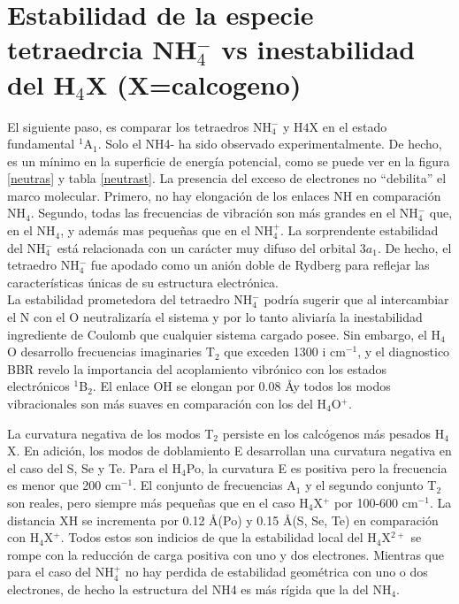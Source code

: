 \documentclass[12pt]{report}
\begin{document}
\section{Estabilidad de la especie tetraedrcia NH$_4^-$ vs inestabilidad del H$_4$X (X=calcogeno)}


El siguiente paso, es comparar los tetraedros NH$_4^-$ y H$4$X en el estado fundamental $^1$A$_1$. Solo el NH4- ha sido observado experimentalmente\cite{Beyer1977}. De hecho, es un mínimo en la superficie de energía potencial, como se puede ver en la figura \ref{neutras} y tabla \ref{neutrast}. La presencia del exceso de electrones no “debilita” el marco molecular. Primero, no hay elongación de los enlaces NH en comparación NH$_4$. Segundo, todas las frecuencias de vibración son más grandes en el NH$_4^-$ que, en el NH$_4$, y además mas pequeñas que en el NH$_4^+$. La sorprendente estabilidad del NH$_4^-$ está relacionada con un carácter muy difuso del orbital $3a_1$. De hecho, el tetraedro NH$_4^-$ fue apodado como un anión doble de Rydberg\cite{Beyer1977} para reflejar las características únicas de su estructura electrónica. 
\\


La estabilidad prometedora del tetraedro NH$_4^-$ podría sugerir que al intercambiar el N con el O neutralizaría el sistema y por lo tanto aliviaría la inestabilidad ingrediente de Coulomb que cualquier sistema cargado posee. Sin embargo, el H$_4$O desarrollo frecuencias imaginaries T$_2$ que exceden 1300 i cm$^{-1}$, y el diagnostico BBR revelo la importancia del acoplamiento vibrónico con los estados electrónicos $^1$B$_2$. El enlace OH se elongan por 0.08 \AA y todos los modos vibracionales son más suaves en comparación con los del H$_4$O$^+$.
\\

\newpage

La curvatura negativa de los modos T$_2$ persiste en los calcógenos más pesados H$_4$X. En adición, los modos de doblamiento E desarrollan una curvatura negativa en el caso del S, Se y Te. Para el H$_4$Po, la curvatura E es positiva pero la frecuencia es menor que 200 cm$^{-1}$. El conjunto de frecuencias A$_1$ y el segundo conjunto T$_2$ son reales, pero siempre más pequeñas que en el caso H$_4$X$^+$ por 100-600 cm$^{-1}$. La distancia XH se incrementa por 0.12 \AA (Po) y 0.15 \AA (S, Se, Te) en comparación con H$_4$X$^+$. Todos estos son indicios de que la estabilidad local del H$_4$X$^{2+}$ se rompe con la reducción de carga positiva con uno y dos electrones. Mientras que para el caso del NH$_4^+$ no hay perdida de estabilidad geométrica con uno o dos electrones, de hecho la estructura del NH4 es más rígida que la del NH$_4$.
\end{document}
